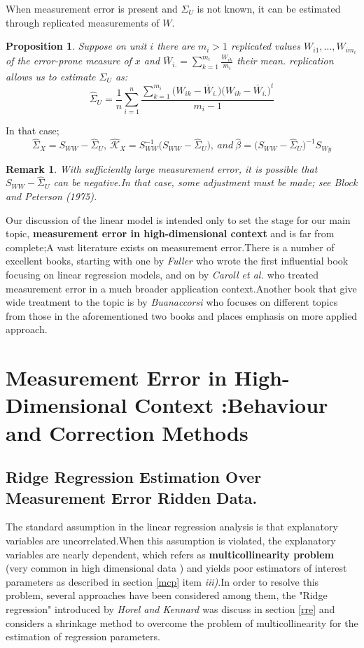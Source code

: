 \documentclass[12pt]{report}
\newtheorem {proposition}{Proposition}[section]  %
\newtheorem{remarque}{Remark}[section]
\begin{document}
When measurement error is present and $\Sigma_{U}$ is not known, it can be estimated through replicated measurements of $W$.
\begin{proposition}
	Suppose on unit $i$ there are $m_{i}>1$ replicated values $W_{i1},\dots,W_{im_{i}}$ of the error-prone measure of $x$ and $\overset{\_}{W}_{i.}=\sum_{k=1}^{m_{i}}\frac{W_{ik}}{m_{i}}$ their mean. replication allows us to estimate $\Sigma_{U}$ as:
	\begin{equation}
		\hat{\Sigma}_{U}=\frac{1}{n}\sum_{i=1}^{n}\frac{\sum_{k=1}^{m_{i}}\big(W_{ik}-\overset{\_}{W}_{i.}\big)\big(W_{ik}-\overset{\_}{W}_{i.}\big)^{t}}{m_{i}-1}
		\label{f55}
	\end{equation}
\end{proposition}
In that case; 
\begin{equation}
	\hat{\Sigma}_{X}=S_{WW}-\hat{\Sigma}_{U},\ \hat{\mathcal{K}}_{X}=S_{WW}^{-1}\big(S_{WW}-\hat{\Sigma}_{U}\big),\ and\ \hat{\beta}=\big(S_{WW}-\hat{\Sigma}_{U}\big)^{-1}S_{Wy}
\end{equation}
\begin{remarque}
	With sufficiently large measurement error, it is possible that $S_{WW}-\hat{\Sigma}_{U}$ can be negative.In that case, some adjustment must be made; \textit{see Block and Peterson (1975)}.
\end{remarque}

Our discussion of the linear model is intended only to set the stage for our main topic, \textbf{measurement error in high-dimensional context} and is far from complete;A vast literature exists on measurement error.There is a number of excellent books, starting with one by \textit{Fuller \cite{nref3}} who wrote the first influential book focusing on linear regression models, and on by \textit{Caroll et al. \cite{nref5}} who treated measurement error in a much broader application context.Another book that give wide treatment to the topic is by \textit{Buanaccorsi \cite{nref2}} who focuses on different topics from those in the aforementioned two books and places emphasis on more applied approach.

\chapter{Measurement Error in High-Dimensional Context :Behaviour and Correction Methods}
\section{ Ridge Regression Estimation Over Measurement Error Ridden Data.}
The standard assumption in the linear regression analysis is that explanatory variables are uncorrelated.When this assumption is violated, the explanatory variables are nearly dependent, which refers as \textbf{multicollinearity problem} (very common in high dimensional data ) and yields poor estimators of interest parameters as described in section \ref{mcp} item \textit{iii)}.In order to resolve this problem, several approaches have been considered among them, the "Ridge regression" introduced by \textit{Horel and Kennard \cite{nref8}} was discuss in section \ref{rre} and considers a shrinkage method to overcome the problem of multicollinearity for the estimation of regression parameters.
\end{document}

